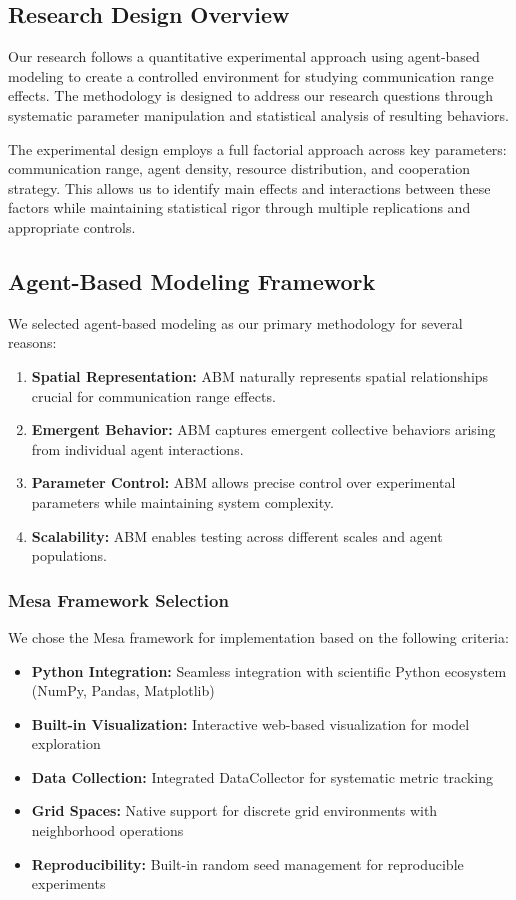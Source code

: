\documentclass[12pt,a4paper]{article}
\begin{document}
\subsection{Research Design Overview}

Our research follows a quantitative experimental approach using agent-based modeling to create a controlled environment for studying communication range effects. The methodology is designed to address our research questions through systematic parameter manipulation and statistical analysis of resulting behaviors.

The experimental design employs a full factorial approach across key parameters: communication range, agent density, resource distribution, and cooperation strategy. This allows us to identify main effects and interactions between these factors while maintaining statistical rigor through multiple replications and appropriate controls.

\subsection{Agent-Based Modeling Framework}

We selected agent-based modeling as our primary methodology for several reasons:

\begin{enumerate}
    \item \textbf{Spatial Representation:} ABM naturally represents spatial relationships crucial for communication range effects.
    \item \textbf{Emergent Behavior:} ABM captures emergent collective behaviors arising from individual agent interactions.
    \item \textbf{Parameter Control:} ABM allows precise control over experimental parameters while maintaining system complexity.
    \item \textbf{Scalability:} ABM enables testing across different scales and agent populations.
\end{enumerate}

\subsubsection{Mesa Framework Selection}

We chose the Mesa framework \parencite{masad2015mesa} for implementation based on the following criteria:

\begin{itemize}
    \item \textbf{Python Integration:} Seamless integration with scientific Python ecosystem (NumPy, Pandas, Matplotlib)
    \item \textbf{Built-in Visualization:} Interactive web-based visualization for model exploration
    \item \textbf{Data Collection:} Integrated DataCollector for systematic metric tracking
    \item \textbf{Grid Spaces:} Native support for discrete grid environments with neighborhood operations
    \item \textbf{Reproducibility:} Built-in random seed management for reproducible experiments
\end{itemize}
\end{document}
